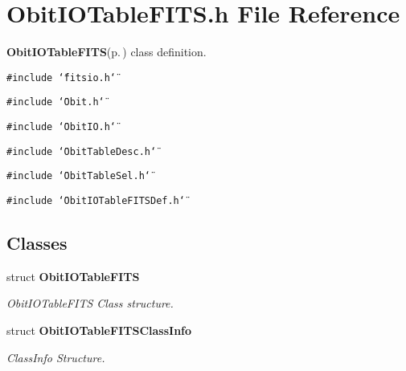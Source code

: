 \section{Obit\-IOTable\-FITS.h File Reference}
\label{ObitIOTableFITS_8h}
{\bf Obit\-IOTable\-FITS}{\rm (p.\,\pageref{structObitIOTableFITS})} class definition. 

{\tt \#include \char`\"{}fitsio.h\char`\"{}}\par
{\tt \#include \char`\"{}Obit.h\char`\"{}}\par
{\tt \#include \char`\"{}Obit\-IO.h\char`\"{}}\par
{\tt \#include \char`\"{}Obit\-Table\-Desc.h\char`\"{}}\par
{\tt \#include \char`\"{}Obit\-Table\-Sel.h\char`\"{}}\par
{\tt \#include \char`\"{}Obit\-IOTable\-FITSDef.h\char`\"{}}\par
\subsection*{Classes}
\begin{CompactItemize}
\item 
struct {\bf Obit\-IOTable\-FITS}
\begin{CompactList}\small\item\em Obit\-IOTable\-FITS Class structure. \item\end{CompactList}\item 
struct {\bf Obit\-IOTable\-FITSClass\-Info}
\begin{CompactList}\small\item\em Class\-Info Structure. \item\end{CompactList}\end{CompactItemize}
